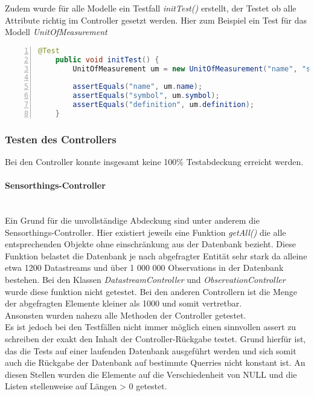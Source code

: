 Zudem wurde für alle Modelle ein Testfall \textit{initTest()} erstellt, der Testet ob alle Attribute richtig im Controller gesetzt werden.
Hier zum Beispiel ein Test für das Modell \textit{UnitOfMeasurement}
\begin{lstlisting}[language=java,
    basicstyle=\normalfont\ttfamily,
    numbers=left,
    numberstyle=\scriptsize,
    stepnumber=1,
    numbersep=8pt,
    showstringspaces=false,
    breaklines=true,
    frame=lines,
    backgroundcolor=\color{background}]
    @Test
    public void initTest() {
        UnitOfMeasurement um = new UnitOfMeasurement("name", "symbol", "definition");

        assertEquals("name", um.name);
        assertEquals("symbol", um.symbol);
        assertEquals("definition", um.definition);
    }
\end{lstlisting}

\subsubsection{Testen des Controllers}
Bei den Controller konnte insgesamt keine 100\% Testabdeckung erreicht werden.

\paragraph{Sensorthings-Controller}\mbox{}\\
Ein Grund für die unvollständige Abdeckung sind unter anderem die Sensorthings-Controller.
Hier existiert jeweils eine Funktion \textit{getAll()} die alle entsprechenden Objekte ohne einschränkung aus der Datenbank bezieht.
Diese Funktion belastet die Datenbank je nach abgefragter Entität sehr stark da alleine etwa 1200 Datastreams und über 1 000 000 Observations in der Datenbank bestehen.
Bei den Klassen \textit{DatastreamController} und \textit{ObservationController} wurde diese funktion nicht getestet.
Bei den anderen Controllern ist die Menge der abgefragten Elemente kleiner als 1000 und somit vertretbar.
\\
Ansonsten wurden nahezu alle Methoden der Controller getestet.
\\
Es ist jedoch bei den Testfällen nicht immer möglich einen sinnvollen assert zu schreiben der exakt den Inhalt der Controller-Rückgabe testet.
Grund hierfür ist, das die Tests auf einer laufenden Datenbank ausgeführt werden und sich somit auch die Rückgabe der Datenbank auf bestimmte Querries nicht konstant ist.
An diesen Stellen wurden die Elemente auf die Verschiedenheit von NULL und die Listen stellenweise auf Längen > 0 getestet.

